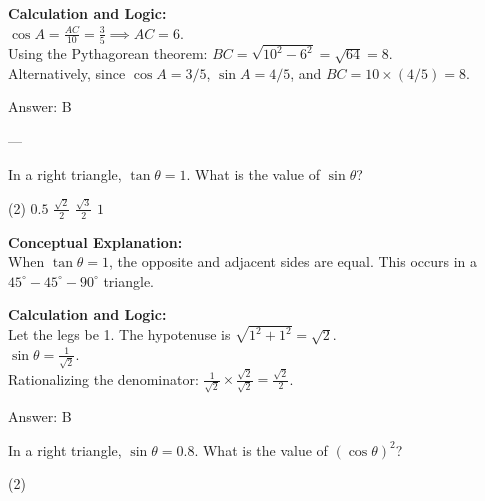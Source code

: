 \documentclass[11pt,paper=a4,answers]{exam}
\begin{document}
\begin{questions}
\begin{solution}
\vspace{10pt}
\textbf{Calculation and Logic:} \\
$\cos A = \frac{AC}{10} = \frac{3}{5} \implies AC = 6$. \\
Using the Pythagorean theorem: $BC = \sqrt{10^2 - 6^2} = \sqrt{64} = 8$. \\
Alternatively, since $\cos A = 3/5$, $\sin A = 4/5$, and $BC = 10 \times (4/5) = 8$.

\vspace{15pt}
Answer: \colorbox{yellow!100}{B}
\end{solution}

---

\question
In a right triangle, $\tan \theta = 1$. What is the value of $\sin \theta$?
\begin{tasks}(2)
    \task $0.5$
    \task $\frac{\sqrt{2}}{2}$
    \task $\frac{\sqrt{3}}{2}$
    \task $1$
\end{tasks}

\begin{solution}
\textbf{Conceptual Explanation:} \\
When $\tan \theta = 1$, the opposite and adjacent sides are equal. This occurs in a $45^\circ-45^\circ-90^\circ$ triangle.

\vspace{10pt}
\textbf{Calculation and Logic:} \\
Let the legs be 1. The hypotenuse is $\sqrt{1^2 + 1^2} = \sqrt{2}$. \\
$\sin \theta = \frac{1}{\sqrt{2}}$. \\
Rationalizing the denominator: $\frac{1}{\sqrt{2}} \times \frac{\sqrt{2}}{\sqrt{2}} = \frac{\sqrt{2}}{2}$.

\vspace{15pt}
Answer: \colorbox{yellow!100}{B}
\end{solution}


\question
In a right triangle, $\sin \theta = 0.8$. What is the value of $(\cos \theta)^2$?
\begin{tasks}(2)
\end{tasks}


\end{questions}
\end{document}
